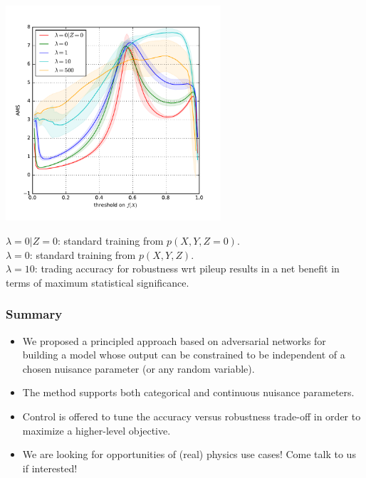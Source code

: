 \documentclass{beamer}
\begin{document}
\begin{frame}
    \begin{center}
        \includegraphics[width=0.6\textwidth]{figures/ams.pdf}
    \end{center}

        {\color{red}$\lambda=0|Z=0$}: standard training from $p(X, Y, Z=0)$.\\
        {\color{green}$\lambda=0$}: standard training from $p(X, Y, Z)$.\\
        {\color{cyan}$\lambda=10$}: trading
         accuracy for robustness wrt pileup
        results in a net benefit in terms of maximum statistical significance.
\end{frame}



\begin{frame}
    \frametitle{Summary}

    \begin{itemize}
        \item We proposed a principled approach based on adversarial networks
        for building a model
        whose output can be constrained to be independent of a chosen
        nuisance parameter (or any random variable).

        \item The method supports both categorical and continuous
        nuisance parameters.

        \item Control is offered to tune the accuracy versus robustness trade-off in
        order to maximize a higher-level objective.

        \vspace{1cm}

        \item {\color{red} We are looking for opportunities of (real) physics use cases! Come talk to us if interested!}

    \end{itemize}
\end{frame}
\end{document}
